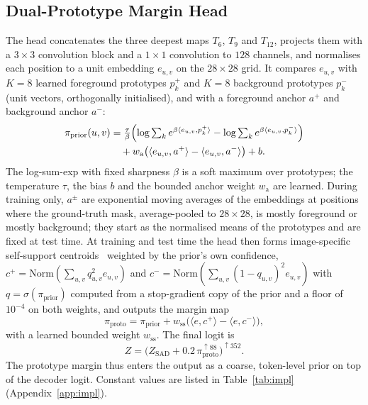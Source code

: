 \documentclass{ieeeaccess}
\begin{document}
\subsection{Dual-Prototype Margin Head}
\label{sec:proto}
The head concatenates the three deepest maps $T_6$, $T_9$ and $T_{12}$, projects them with a $3\times3$ convolution block and a $1\times1$ convolution to $128$ channels, and normalises each position to a unit embedding $e_{u,v}$ on the $28\times28$ grid. It compares $e_{u,v}$ with $K=8$ learned foreground prototypes $p_k^+$ and $K=8$ background prototypes $p_k^-$ (unit vectors, orthogonally initialised), and with a foreground anchor $a^+$ and background anchor $a^-$:
\begin{align}
  \pi_{\text{prior}}(u,v) &= \tfrac{\tau}{\beta}\Bigl(\log\textstyle\sum_k e^{\beta\langle e_{u,v},p_k^+\rangle}-\log\textstyle\sum_k e^{\beta\langle e_{u,v},p_k^-\rangle}\Bigr)\nonumber\\
  &\quad + w_{\text{a}}\bigl(\langle e_{u,v},a^+\rangle-\langle e_{u,v},a^-\rangle\bigr)+b.
  \label{eq:proto_prior}
\end{align}
The log-sum-exp with fixed sharpness $\beta$ is a soft maximum over prototypes; the temperature $\tau$, the bias $b$ and the bounded anchor weight $w_{\text{a}}$ are learned. During training only, $a^\pm$ are exponential moving averages of the embeddings at positions where the ground-truth mask, average-pooled to $28\times28$, is mostly foreground or mostly background; they start as the normalised means of the prototypes and are fixed at test time. At training and test time the head then forms image-specific self-support centroids~\cite{fan2022ssp} weighted by the prior's own confidence, $c^+=\mathrm{Norm}(\sum_{u,v}q_{u,v}^2e_{u,v})$ and $c^-=\mathrm{Norm}(\sum_{u,v}(1-q_{u,v})^2e_{u,v})$ with $q=\sigma(\pi_{\text{prior}})$ computed from a stop-gradient copy of the prior and a floor of $10^{-4}$ on both weights, and outputs the margin map
\begin{equation}
  \pi_{\text{proto}}=\pi_{\text{prior}}+w_{\text{ss}}\bigl(\langle e,c^+\rangle-\langle e,c^-\rangle\bigr),
  \label{eq:proto_total}
\end{equation}
with a learned bounded weight $w_{\text{ss}}$. The final logit is
\begin{equation}
  Z=\bigl(Z_{\text{SAD}}+0.2\,\pi_{\text{proto}}^{\uparrow88}\bigr)^{\uparrow352}.
  \label{eq:output}
\end{equation}
The prototype margin thus enters the output as a coarse, token-level prior on top of the decoder logit. Constant values are listed in Table~\ref{tab:impl} (Appendix~\ref{app:impl}).
\end{document}
